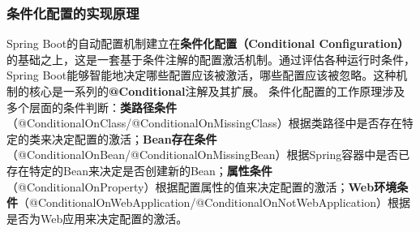 \subsubsection{条件化配置的实现原理}\label{ux6761ux4ef6ux5316ux914dux7f6eux7684ux5b9eux73b0ux539fux7406} Spring
Boot的自动配置机制建立在\textbf{条件化配置（Conditional Configuration）}的基础之上，这是一套基于条件注解的配置激活机制。通过评估各种运行时条件，Spring
Boot能够智能地决定哪些配置应该被激活，哪些配置应该被忽略。这种机制的核心是一系列的\textbf{@Conditional}注解及其扩展。
条件化配置的工作原理涉及多个层面的条件判断：\textbf{类路径条件}（@ConditionalOnClass/@ConditionalOnMissingClass）根据类路径中是否存在特定的类来决定配置的激活；\textbf{Bean存在条件}（@ConditionalOnBean/@ConditionalOnMissingBean）根据Spring容器中是否已存在特定的Bean来决定是否创建新的Bean；\textbf{属性条件}（@ConditionalOnProperty）根据配置属性的值来决定配置的激活；\textbf{Web环境条件}（@ConditionalOnWebApplication/@ConditionalOnNotWebApplication）根据是否为Web应用来决定配置的激活。
